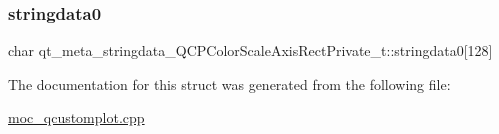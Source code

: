 \subsubsection{\texorpdfstring{stringdata0}{stringdata0}}
{\footnotesize\ttfamily char qt\+\_\+meta\+\_\+stringdata\+\_\+\+Q\+C\+P\+Color\+Scale\+Axis\+Rect\+Private\+\_\+t\+::stringdata0\mbox{[}128\mbox{]}}



The documentation for this struct was generated from the following file\+:\begin{DoxyCompactItemize}
\item 
\mbox{\hyperlink{moc__qcustomplot_8cpp}{moc\+\_\+qcustomplot.\+cpp}}\end{DoxyCompactItemize}
